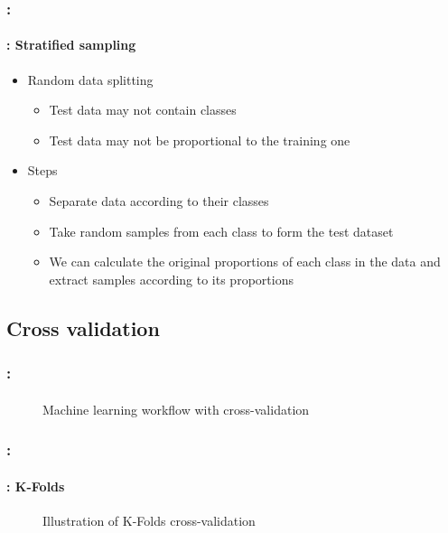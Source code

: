 \documentclass[xcolor=table]{beamer}
\begin{document}
\begin{frame}
	\frametitle{\insertshortsubtitle: \insertsection}
	\framesubtitle{\insertsubsection: Stratified sampling}
	
	\begin{itemize}
		\item Random data splitting
		\begin{itemize}
			\item Test data may not contain classes
			\item Test data may not be proportional to the training one
		\end{itemize}
		\item Steps
		\begin{itemize}
			\item Separate data according to their classes
			\item Take random samples from each class to form the test dataset
			\item We can calculate the original proportions of each class in the data and extract samples according to its proportions
		\end{itemize}
	\end{itemize}
	
\end{frame}

\subsection{Cross validation}

\begin{frame}
	\frametitle{\insertshortsubtitle: \insertsection}
	\framesubtitle{\insertsubsection}
	
	\begin{figure}
		\centering
		\caption{Machine learning workflow with cross-validation \cite{2020-sklearn-man}}
	\end{figure}
	
\end{frame}


\begin{frame}
	\frametitle{\insertshortsubtitle: \insertsection}
	\framesubtitle{\insertsubsection: K-Folds}
	
	\begin{figure}
		\centering
		\caption{Illustration of K-Folds cross-validation \cite{2020-sklearn-man}}
	\end{figure}
	
\end{frame}
\end{document}
